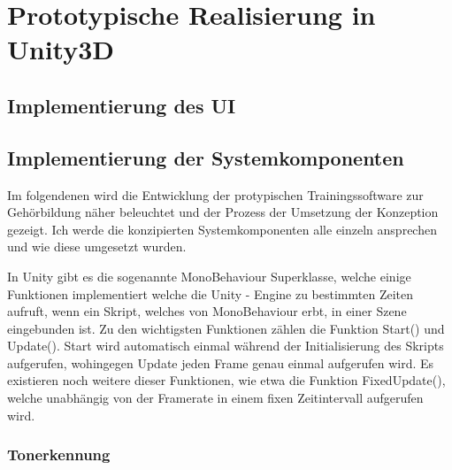 \chapter{Prototypische Realisierung in Unity3D}

\section{Implementierung des UI}

\section{Implementierung der Systemkomponenten}
Im folgendenen wird die Entwicklung der protypischen Trainingssoftware zur Gehörbildung näher beleuchtet und der Prozess der Umsetzung der Konzeption gezeigt. Ich werde die konzipierten Systemkomponenten alle einzeln ansprechen und wie diese umgesetzt wurden. 

In Unity gibt es die sogenannte MonoBehaviour Superklasse, welche einige Funktionen implementiert welche die Unity - Engine zu bestimmten Zeiten aufruft, wenn ein Skript, welches von MonoBehaviour erbt, in einer Szene eingebunden ist. Zu den wichtigsten Funktionen zählen die Funktion Start() und Update(). Start wird automatisch einmal während der Initialisierung des Skripts aufgerufen, wohingegen Update jeden Frame genau einmal aufgerufen wird. Es existieren noch weitere dieser Funktionen, wie etwa die Funktion FixedUpdate(), welche unabhängig von der Framerate in einem fixen Zeitintervall aufgerufen wird.

\subsection*{Tonerkennung}

